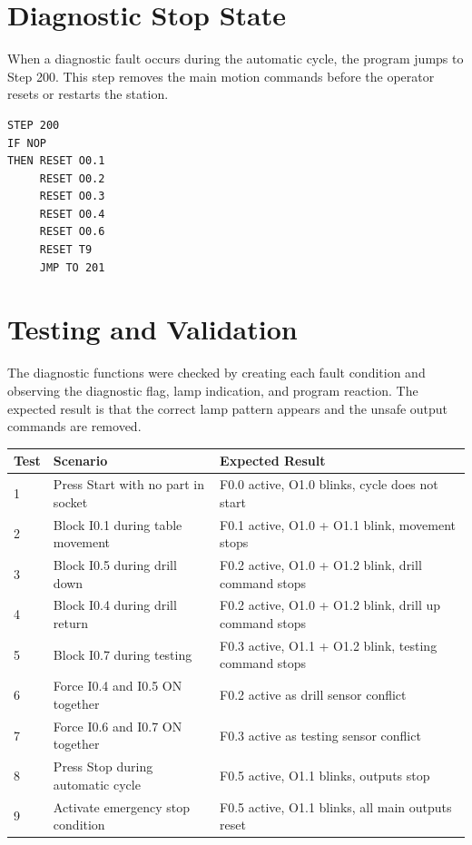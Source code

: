 \section{Diagnostic Stop State}

When a diagnostic fault occurs during the automatic cycle, the program jumps to Step 200. This step removes the main motion commands before the operator resets or restarts the station.

\begin{verbatim}
STEP 200
IF NOP
THEN RESET O0.1
     RESET O0.2
     RESET O0.3
     RESET O0.4
     RESET O0.6
     RESET T9
     JMP TO 201
\end{verbatim}

\section{Testing and Validation}

The diagnostic functions were checked by creating each fault condition and observing the diagnostic flag, lamp indication, and program reaction. The expected result is that the correct lamp pattern appears and the unsafe output commands are removed.

\begin{longtable}{|p{1.0cm}|p{6.0cm}|p{5.8cm}|}
\hline
Test & Scenario & Expected Result \\
\hline
1 & Press Start with no part in socket & F0.0 active, O1.0 blinks, cycle does not start \\
\hline
2 & Block I0.1 during table movement & F0.1 active, O1.0 + O1.1 blink, movement stops \\
\hline
3 & Block I0.5 during drill down & F0.2 active, O1.0 + O1.2 blink, drill command stops \\
\hline
4 & Block I0.4 during drill return & F0.2 active, O1.0 + O1.2 blink, drill up command stops \\
\hline
5 & Block I0.7 during testing & F0.3 active, O1.1 + O1.2 blink, testing command stops \\
\hline
6 & Force I0.4 and I0.5 ON together & F0.2 active as drill sensor conflict \\
\hline
7 & Force I0.6 and I0.7 ON together & F0.3 active as testing sensor conflict \\
\hline
8 & Press Stop during automatic cycle & F0.5 active, O1.1 blinks, outputs stop \\
\hline
9 & Activate emergency stop condition & F0.5 active, O1.1 blinks, all main outputs reset \\
\hline
\end{longtable}

